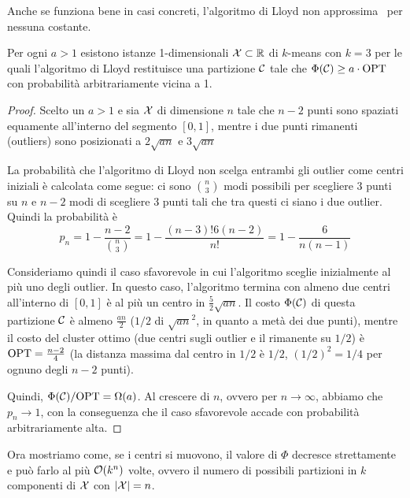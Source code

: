 Anche se funziona bene in casi concreti, l'algoritmo di Lloyd non approssima \Opt\ per nessuna costante. \\

\begin{theorem}
    \label{theo:inapprox-lloyd}
    Per ogni $a > 1$ esistono istanze 1-dimensionali $\mathcal{X} \subset \mathbb{R}$ di $k$-means con $k = 3$ per le quali l'algoritmo di Lloyd restituisce una partizione $\mathcal{C}$ tale che $\Phi (\mathcal{C}) \geq a \cdot \textnormal{OPT}$ con probabilità arbitrariamente vicina a 1.
\end{theorem}
\begin{proof}
    Scelto un $a > 1$ e sia $\mathcal{X}$ di dimensione $n$ tale che $n-2$ punti sono spaziati equamente all'interno del segmento $[0,1]$, mentre i due punti rimanenti (outliers) sono posizionati a $2 \sqrt{an}$ e $3 \sqrt{an}$
    \begin{center}
        
    \end{center}

    La probabilità che l'algoritmo di Lloyd non scelga entrambi gli outlier come centri iniziali è calcolata come segue: ci sono $\binom{n}{3}$ modi possibili per scegliere 3 punti su $n$ e $n-2$ modi di scegliere 3 punti tali che tra questi ci siano i due outlier. Quindi la probabilità è
    $$ p_n = 1 - \frac{n-2}{\binom{n}{3}} = 1 - \frac{(n-3)! 6 (n - 2)}{n!} = 1 - \frac{6}{n (n - 1)} $$

    Consideriamo quindi il caso sfavorevole in cui l'algoritmo sceglie inizialmente al più uno degli outlier. In questo caso, l'algoritmo termina con almeno due centri all'interno di $[0,1]$ è al più un centro in $\frac{5}{2} \sqrt{an}$. Il costo $\Phi (\mathcal{C})$ di questa partizione $\mathcal{C}$ è almeno $\frac{an}{2}$ ($1/2$ di $\sqrt{an}^2$, in quanto a metà dei due punti), mentre il costo del cluster ottimo (due centri sugli outlier e il rimanente su $1/2$) è $\textnormal{OPT} = \frac{n-2}{4}$ (la distanza massima dal centro in $1/2$ è $1/2$, $(1/2)^2 = 1/4$ per ognuno degli $n-2$ punti).

    Quindi, $\Phi(\mathcal{C}) / \textnormal{OPT} = \Omega (a)$. Al crescere di $n$, ovvero per $n \rightarrow \infty$, abbiamo che $p_n \rightarrow 1$, con la conseguenza che il caso sfavorevole accade con probabilità arbitrariamente alta.
\end{proof}

Ora mostriamo come, se i centri si muovono, il valore di $\Phi$ decresce strettamente e può farlo al più $\mathcal{O} (k^n)$ volte, ovvero il numero di possibili partizioni in $k$ componenti di $\mathcal{X}$ con $|\mathcal{X}| = n$.\\

